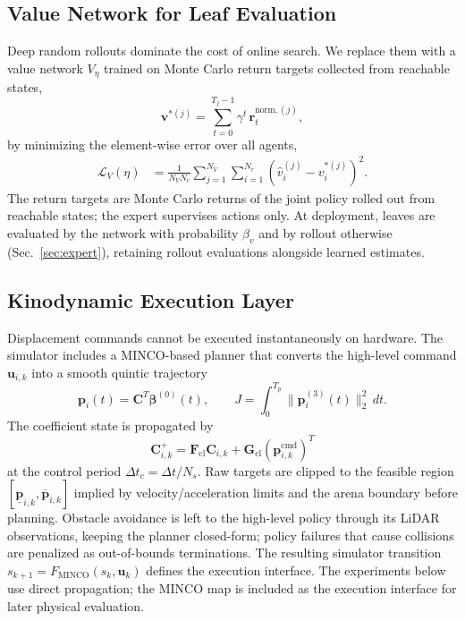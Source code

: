 \documentclass[letterpaper,10pt,conference]{ieeeconf}
\begin{document}
\subsection{Value Network for Leaf Evaluation}

Deep random rollouts dominate the cost of online search. We replace them
with a value network $V_\eta$ trained on Monte Carlo return targets
collected from reachable states,
\begin{equation}
\mathbf{v}^{*(j)}
=\sum_{t=0}^{T_j-1}\gamma^t\,
\mathbf r_{t}^{\mathrm{norm},(j)} ,
\label{eq:value_target}
\end{equation}
by minimizing the element-wise error over all agents,
\begin{equation}
\begin{aligned}
\mathcal L_V(\eta)
&=\frac{1}{N_VN_r}
\sum_{j=1}^{N_V}\sum_{i=1}^{N_r}
\left(\hat v_i^{(j)}-v_i^{*(j)}\right)^2 .
\end{aligned}
\label{eq:value_loss}
\end{equation}
The return targets are Monte Carlo returns of the joint policy rolled out
from reachable states; the expert supervises actions only.
At deployment, leaves are evaluated by the network with probability
$\beta_v$ and by rollout otherwise (Sec.~\ref{sec:expert}), retaining rollout
evaluations alongside learned estimates.

\subsection{Kinodynamic Execution Layer}

Displacement commands cannot be executed instantaneously on hardware.
The simulator includes a
MINCO-based planner \cite{wang2022geometrically} that converts the high-level
command $\mathbf{u}_{i,k}$ into a smooth quintic trajectory
\begin{equation}
\mathbf p_i(t)=\mathbf C^T\bm\beta^{(0)}(t),\qquad
J=\int_0^{T_p}\|\mathbf p_i^{(3)}(t)\|_2^2\,dt .
\end{equation}
The coefficient state is propagated by
\begin{equation}
\mathbf C^+_{i,k}
=\mathbf F_{\mathrm{cl}}\mathbf C_{i,k}
+\mathbf G_{\mathrm{cl}}(\mathbf p^{\mathrm{cmd}}_{i,k})^T
\end{equation}
at the control period $\Delta t_c=\Delta t/N_s$. Raw targets are clipped
to the feasible region $[\underline{\mathbf{p}}_{i,k},
\overline{\mathbf{p}}_{i,k}]$ implied by velocity/acceleration limits and
the arena boundary before planning. Obstacle avoidance is left to the
high-level policy through its LiDAR observations, keeping the planner
closed-form; policy failures that cause collisions are penalized as
out-of-bounds terminations. The resulting simulator transition
    $s_{k+1}=F_{\mathrm{MINCO}}(s_k,\mathbf{u}_k)$ defines the execution
interface. The experiments below use direct propagation; the MINCO map is
included as the execution interface for later physical evaluation.
\end{document}
